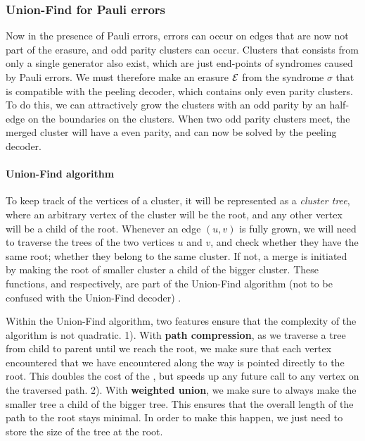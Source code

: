 \subsubsection{Union-Find for Pauli errors}
Now in the presence of Pauli errors, errors can occur on edges that are now not part of the erasure, and odd parity clusters can occur. Clusters that consists from only a single generator also exist, which are just end-points of syndromes caused by Pauli errors. We must therefore make an erasure $\mathcal{E}$ from the syndrome $\sigma$ that is compatible with the peeling decoder, which contains only even parity clusters. To do this, we can attractively grow the clusters with an odd parity by an half-edge on the boundaries on the clusters. When two odd parity clusters meet, the merged cluster will have a even parity, and can now be solved by the peeling decoder.

\paragraph{Union-Find algorithm}


To keep track of the vertices of a cluster, it will be represented as a \emph{cluster tree}, where an arbitrary vertex of the cluster will be the root, and any other vertex will be a child of the root. Whenever an edge $(u,v)$ is fully grown, we will need to traverse the trees of the two vertices $u$ and $v$, and check whether they have the same root; whether they belong to the same cluster. If not, a merge is initiated by making the root of smaller cluster a child of the bigger cluster. These functions,  and  respectively, are part of the Union-Find algorithm (not to be confused with the Union-Find decoder) \cite{tarjan1975efficiency}.



Within the Union-Find algorithm, two features ensure that the complexity of the algorithm is not quadratic. 1). With \textbf{path compression}, as we traverse a tree from child to parent until we reach the root, we make sure that each vertex encountered that we have encountered along the way is pointed directly to the root. This doubles the cost of the , but speeds up any future call to any vertex on the traversed path. 2). With \textbf{weighted union}, we make sure to always make the smaller tree a child of the bigger tree. This ensures that the overall length of the path to the root stays minimal. In order to make this happen, we just need to store the size of the tree at the root.

